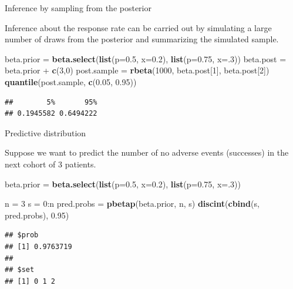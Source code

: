 \documentclass{beamer}
\newenvironment{Shaded}{}{}
\newcommand{\KeywordTok}[1]{\textcolor[rgb]{0.00,0.44,0.13}{\textbf{{#1}}}}
\newcommand{\DataTypeTok}[1]{\textcolor[rgb]{0.56,0.13,0.00}{{#1}}}
\newcommand{\DecValTok}[1]{\textcolor[rgb]{0.25,0.63,0.44}{{#1}}}
\newcommand{\FloatTok}[1]{\textcolor[rgb]{0.25,0.63,0.44}{{#1}}}
\newcommand{\StringTok}[1]{\textcolor[rgb]{0.25,0.44,0.63}{{#1}}}
\newcommand{\NormalTok}[1]{{#1}}
\begin{document}
\begin{frame}[fragile]{Inference by sampling from the posterior}

Inference about the response rate can be carried out by simulating a
large number of draws from the posterior and summarizing the simulated
sample.

\begin{Shaded}
\begin{Highlighting}[]
\NormalTok{beta.prior =}\StringTok{ }\KeywordTok{beta.select}\NormalTok{(}\KeywordTok{list}\NormalTok{(}\DataTypeTok{p=}\FloatTok{0.5}\NormalTok{, }\DataTypeTok{x=}\FloatTok{0.2}\NormalTok{), }
\newline\KeywordTok{list}\NormalTok{(}\DataTypeTok{p=}\FloatTok{0.75}\NormalTok{, }\DataTypeTok{x=}\NormalTok{.}\DecValTok{3}\NormalTok{))}
\NormalTok{beta.post =}\StringTok{ }\NormalTok{beta.prior +}\StringTok{ }\KeywordTok{c}\NormalTok{(}\DecValTok{3}\NormalTok{,}\DecValTok{0}\NormalTok{)}
\NormalTok{post.sample =}\StringTok{ }\KeywordTok{rbeta}\NormalTok{(}\DecValTok{1000}\NormalTok{, beta.post[}\DecValTok{1}\NormalTok{], beta.post[}\DecValTok{2}\NormalTok{])}
\KeywordTok{quantile}\NormalTok{(post.sample, }\KeywordTok{c}\NormalTok{(}\FloatTok{0.05}\NormalTok{, }\FloatTok{0.95}\NormalTok{))}
\end{Highlighting}
\end{Shaded}

\begin{verbatim}
##        5%       95% 
## 0.1945582 0.6494222
\end{verbatim}

\end{frame}

\begin{frame}[fragile]{Predictive distribution}

Suppose we want to predict the number of no adverse events (successes)
in the next cohort of 3 patients.

\begin{Shaded}
\begin{Highlighting}[]
\NormalTok{beta.prior =}\StringTok{ }\KeywordTok{beta.select}\NormalTok{(}\KeywordTok{list}\NormalTok{(}\DataTypeTok{p=}\FloatTok{0.5}\NormalTok{, }\DataTypeTok{x=}\FloatTok{0.2}\NormalTok{), }
\newline\KeywordTok{list}\NormalTok{(}\DataTypeTok{p=}\FloatTok{0.75}\NormalTok{, }\DataTypeTok{x=}\NormalTok{.}\DecValTok{3}\NormalTok{))}

\NormalTok{n =}\StringTok{ }\DecValTok{3}
\NormalTok{s =}\StringTok{ }\DecValTok{0}\NormalTok{:n}
\NormalTok{pred.probs =}\StringTok{ }\KeywordTok{pbetap}\NormalTok{(beta.prior, n, s)}
\KeywordTok{discint}\NormalTok{(}\KeywordTok{cbind}\NormalTok{(s, pred.probs), }\FloatTok{0.95}\NormalTok{)}
\end{Highlighting}
\end{Shaded}

\begin{verbatim}
## $prob
## [1] 0.9763719
## 
## $set
## [1] 0 1 2
\end{verbatim}

\end{frame}
\end{document}
